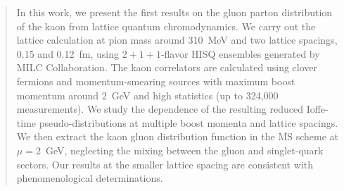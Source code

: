 \begin{abstract}
In this work, we present the first results on the gluon parton distribution of the kaon from lattice quantum chromodynamics.
We carry out the lattice calculation at pion mass around 310~MeV and two lattice spacings, 0.15 and 0.12~fm, using $2+1+1$-flavor HISQ ensembles generated by MILC Collaboration.
The kaon correlators are calculated using clover fermions and momentum-smearing sources with maximum boost momentum around 2~GeV and high statistics (up to 324,000 measurements).
We study the dependence of the resulting reduced Ioffe-time pseudo-distributions at multiple boost momenta and lattice spacings.
We then extract the kaon gluon distribution function in the $\overline{\text{MS}}$ scheme at $\mu = 2$~GeV, neglecting the mixing between the gluon and singlet-quark sectors.
Our results at the smaller lattice spacing are consistent with phenomenological determinations.
\end{abstract}

